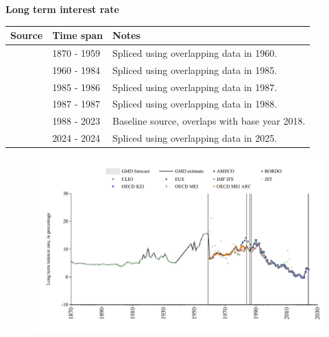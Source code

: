 \documentclass[12pt,a4paper,landscape]{article}
\begin{document}
\begin{adjustbox}{max totalsize={\paperwidth}{\paperheight},center}
\begin{minipage}[t][\textheight][t]{\textwidth}
\vspace*{0.5cm}
{}
\begin{center}
{\Large\bfseries Long term interest rate}
\end{center}
\vspace{0.5cm}
\begin{table}[H]
\centering
\small
\begin{tabular}{|l|l|l|}
\hline
\textbf{Source} & \textbf{Time span} & \textbf{Notes} \\
\hline
\rowcolor{white}\cite{JST}& 1870 - 1959 &Spliced using overlapping data in 1960. \\
\rowcolor{lightgray}\cite{OECD_MEI_ARC}& 1960 - 1984 &Spliced using overlapping data in 1985. \\
\rowcolor{white}\cite{JST}& 1985 - 1986 &Spliced using overlapping data in 1987. \\
\rowcolor{lightgray}\cite{EUS}& 1987 - 1987 &Spliced using overlapping data in 1988. \\
\rowcolor{white}\cite{OECD_MEI}& 1988 - 2023 &Baseline source, overlaps with base year 2018. \\
\rowcolor{lightgray}\cite{EUS}& 2024 - 2024 &Spliced using overlapping data in 2025. \\
\hline
\end{tabular}
\end{table}
\begin{figure}[H]
\centering
\includegraphics[width=\textwidth,height=0.6\textheight,keepaspectratio]{graphs/FIN_ltrate.pdf}
\end{figure}
\end{minipage}
\end{adjustbox}
\end{document}
